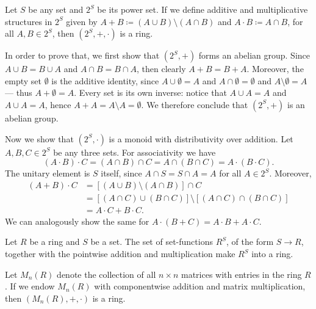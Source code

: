 %
\begin{example}
\label{exp:power-set-ring}
Let \(S\) be any set and \(2^S\) be its power set. If we define additive and
multiplicative structures in \(2^S\) given by
\(A + B \coloneq (A \cup B) \setminus (A \cap B)\) and
\(A \cdot B \coloneq A \cap B\), for all \(A, B \in 2^S\), then
\((2^S, +, \cdot)\) is a ring.

In order to prove that, we first show that \((2^S, +)\) forms an abelian
group. Since \(A \cup B = B \cup A\) and \(A \cap B = B \cap A\), then clearly
\(A + B = B + A\). Moreover, the empty set \(\emptyset\) is the additive
identity, since \(A \cup \emptyset = A\) and \(A \cap \emptyset = \emptyset\)
and \(A \setminus \emptyset = A\) --- thus \(A + \emptyset = A\). Every set is
its own inverse: notice that \(A \cup A = A\) and \(A \cup A = A\), hence
\(A + A = A \setminus A = \emptyset\). We therefore conclude that \((2^S, +)\)
is an abelian group.

Now we show that \((2^S, \cdot)\) is a monoid with distributivity over
addition. Let \(A, B, C \in 2^S\) be any three sets. For associativity we have
\[
  (A \cdot B) \cdot C
  = (A \cap B) \cap C
  = A \cap (B \cap C)
  = A \cdot (B \cdot C).
\]
The unitary element is \(S\) itself, since \(A \cap S = S \cap A = A\) for all
\(A \in 2^S\). Moreover,
\begin{align*}
  (A + B) \cdot C
  &= [(A \cup B) \setminus (A \cap B)] \cap C \\
  &= [(A \cap C) \cup (B \cap C)] \setminus [(A \cap C) \cap (B \cap C)] \\
  &= A \cdot C + B \cdot C.
\end{align*}
We can analogously show the same for
\(A \cdot (B + C) = A \cdot B + A \cdot C\).
\end{example}
%

%
\begin{example}
\label{exp:function-ring}
Let \(R\) be a ring and \(S\) be a set. The set of set-functions \(R^S\), of the
form \(S \to R\), together with the pointwise addition and multiplication make
\(R^S\) into a ring.
\end{example}
%

%
\begin{example}
\label{exp:square-matrices-ring}
Let \(M_n(R)\) denote the collection of all \(n \times n\) matrices with entries
in the ring \(R\). If we endow \(M_n(R)\) with componentwise addition and matrix
multiplication, then \((M_n(R), +, \cdot)\) is a ring.
\end{example}
%

